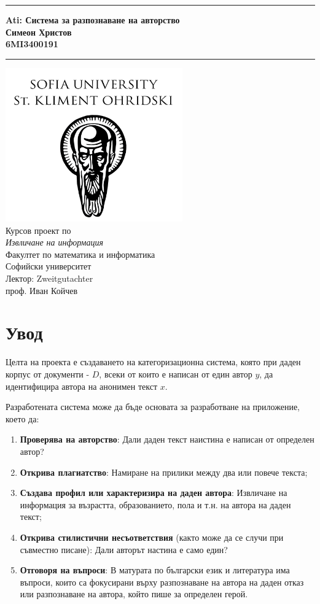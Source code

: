 \documentclass[12pt]{article}
\newcommand{\JMUTitle}[9]{

  \thispagestyle{empty}
  \vspace*{\stretch{1}}
  {\parindent0cm
  \rule{\linewidth}{.7ex}}
  \begin{flushright}
    \vspace*{\stretch{1}}
    \sffamily\bfseries\Huge
    #1\\
    \vspace*{\stretch{1}}
    \sffamily\bfseries\large
    #2\\
    \vspace*{\stretch{1}}
    \sffamily\bfseries\small
    #3
  \end{flushright}
  \rule{\linewidth}{.7ex}

  \vspace*{\stretch{1}}
  \begin{center}
    \includegraphics[width=3in]{./images/logo.png} \\
    \vspace*{\stretch{1}}
    \Large Курсов проект по \\ \textit{Извличане на информация} \\

    \vspace*{\stretch{2}}
    \large Факултет по математика и информатика\\
    \large Софийски университет\\
    
    \vspace*{\stretch{1}}
    \large Лектор: #8 \\[1mm]
    
    \vspace*{\stretch{1}}
    \large #7 \\

  \end{center}
}
\begin{document}
  

  \JMUTitle
      {Ati: Система за разпознаване на авторство}
      {Симеон Христов}
      {6MI3400191}
      
      {Wirtschaftswissenschaftlichen Fakultät}  %
      {W"urzburg 2018}                          %
      {Февруари 2023}                              %
      {проф. Иван Койчев}               %
      {Zweitgutachter}                          %

  \clearpage

\tableofcontents

\clearpage

\section{Увод}

    Целта на проекта е създаването на категоризационна система, която при даден корпус от документи - $D$, всеки от които е написан от един автор $y$, да идентифицира автора на анонимен текст $x$.
    
    \vspace{1em}
    
    Разработената система може да бъде основата за разработване на приложение, което да:
    
    \begin{enumerate}
        \item \textbf{Проверява на авторство}: Дали даден текст наистина е написан от определен автор?
        \item \textbf{Открива плагиатство}: Намиране на прилики между два или повече текста;
        \item \textbf{Създава профил или характеризира на даден автора}: Извличане на информация за възрастта, образованието, пола и т.н. на автора на даден текст;
        \item \textbf{Открива стилистични несъответствия} (както може да се случи при съвместно писане): Дали авторът настина е само един?
        \item \textbf{Отговоря на въпроси}: В матурата по български език и литература има въпроси, които са фокусирани върху разпознаване на автора на даден отказ или разпознаване на автора, който пише за определен герой.
    \end{enumerate}
    
    \vspace{1em}
    
\end{document}

